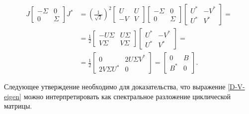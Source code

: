 \begin{equation*}
    \begin{split}
        J \begin{bmatrix} -\Sigma & 0 \\ 0 & \Sigma \end{bmatrix} J^* 
        &= \left( \frac{1}{\sqrt{2}}\right)^2 
            \begin{bmatrix} U & U \\ -V & V \end{bmatrix}
            \begin{bmatrix} -\Sigma & 0 \\ 0 & \Sigma \end{bmatrix}
            \begin{bmatrix} U^* & -V^* \\ U^* & V^* \end{bmatrix}= \\[6pt]
        &= \frac{1}{2} 
            \begin{bmatrix} -U\Sigma & U\Sigma \\ V\Sigma & V\Sigma \end{bmatrix}
            \begin{bmatrix} U^* & -V^* \\ U^* & V^* \end{bmatrix}=\\[6pt] 
        &= \frac{1}{2} 
            \begin{bmatrix} 0 & 2 U\Sigma V^* \\ 2 V\Sigma U^* & 0 \end{bmatrix} = \begin{bmatrix} 0 & B \\ B^* & 0 \end{bmatrix}.
    \end{split}
\end{equation*}

Следующее утверждение необходимо для доказательства, что выражение \eqref{D-V-eigen} можно интерпретировать как спектральное разложение циклической матрицы.

